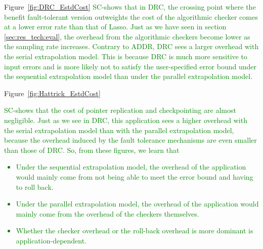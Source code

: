 \documentclass[10pt, conference, compsocconf]{IEEEtran}
\newcommand{\sui}[1]{%
  \textcolor{green}{SC-#1}
}
\begin{document}
Figure~\ref{fig:DRC_EstdCost}
\sui{shows that in DRC, the crossing point where the benefit fault-tolerant version outweights the cost of the algorithmic checker comes at a lower error rate than
that of Lasso. Just as we have seen in section \ref{sec:res_tech:eval}, the overhead from the algorithmic checkers become lower as the sampling rate increases.
Contrary to ADDR, DRC sees a larger overhead with the serial extrapolation model. This is because DRC is much more sensitive to input errors and is more likely
not to satisfy the user-specified error bound under the sequential extrapolation model than under the parallel extrapolation model.
}

Figure~\ref{fig:Hattrick_EstdCost}
\sui{shows that the cost of pointer replication and checkpointing are almost negligible. Just as we see in DRC, this application sees a higher overhead with the serial extrapolation model than with the parallel extrapolation model, because the overhead induced by the fault tolerance mechanisms are
even smaller than those of DRC.
So, from these figures, we learn that
\begin{itemize}
\item{Under the sequential extrapolation model, the overhead of the application would mainly come from not being able to meet the error bound and having to roll back.}
\item{Under the parallel extrapolation model, the overhead of the application would mainly come from the overhead of the checkers themselves.}
\item{Whether the checker overhead or the roll-back overhead is more dominant is application-dependent.}
\end{itemize}
}
\end{document}
